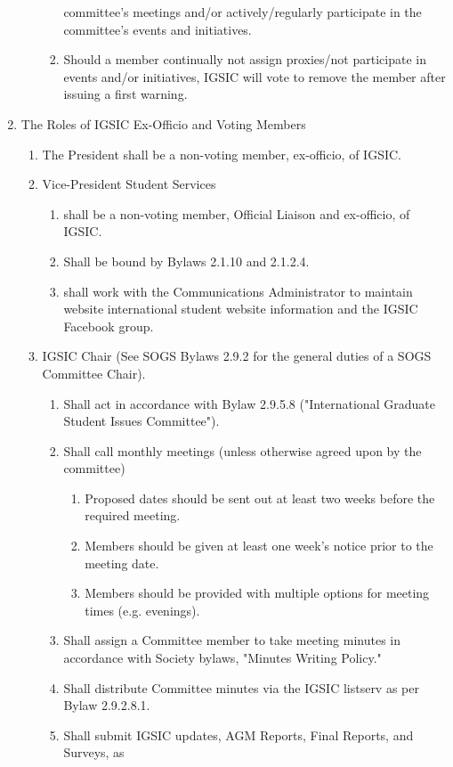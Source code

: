 \begin{enumerate}[label*=\arabic*., align=left]
\begin{enumerate}[label*=\arabic*., align=left]
\begin{enumerate}
committee's meetings and/or actively/regularly participate in the
committee's events and initiatives.
\item Should a member continually not assign proxies/not participate in events
and/or initiatives, IGSIC will vote to remove the member after issuing a first
warning.
\end{enumerate}
\end{enumerate}
\item The Roles of IGSIC Ex-Officio and Voting Members
\begin{enumerate}[label*=\arabic*., align=left]
\item The President shall be a non-voting member, ex-officio, of IGSIC.
\item Vice-President Student Services 
\begin{enumerate}
\item shall be a non-voting member, Official Liaison and ex-officio, of IGSIC.
\item Shall be bound by Bylaws 2.1.10 and 2.1.2.4.
\item shall work with the Communications Administrator to maintain website
international student website information and the IGSIC Facebook group.
\end{enumerate}
\item IGSIC Chair (See SOGS Bylaws 2.9.2 for the general duties of a SOGS Committee Chair).
\begin{enumerate}
\item Shall act in accordance with Bylaw 2.9.5.8 ("International Graduate Student Issues Committee").
\item Shall call monthly meetings (unless otherwise agreed upon by the committee)
\begin{enumerate}[label*=\arabic*., align=left]
\item Proposed dates should be sent out at least two weeks before the required
meeting.
\item Members should be given at least one week's notice prior to the meeting date.
\item Members should be provided with multiple options for meeting times (e.g. evenings).
\end{enumerate}
\item Shall assign a Committee member to take meeting minutes in accordance with
Society bylaws, "Minutes Writing Policy."
\item Shall distribute Committee minutes via the IGSIC listserv as per Bylaw 2.9.2.8.1.
\item Shall submit IGSIC updates, AGM Reports, Final Reports, and Surveys, as

\end{enumerate}
\end{enumerate}
\end{enumerate}
